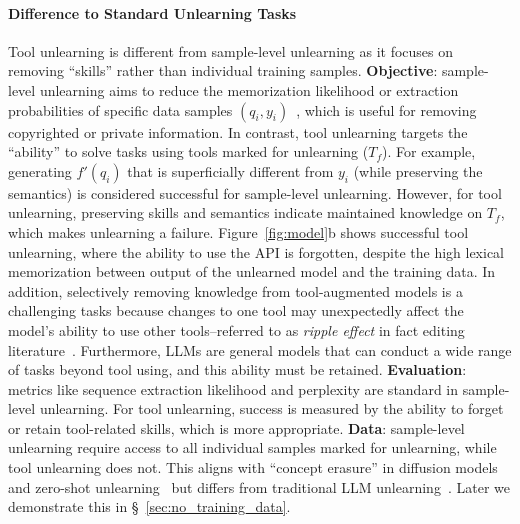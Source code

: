 \paragraph{Difference to Standard Unlearning Tasks} \label{sec:diff}
Tool unlearning is different from sample-level unlearning as it focuses on removing ``skills'' rather than individual training samples. 
%
\textbf{Objective}: sample-level unlearning aims to reduce the memorization likelihood or extraction probabilities of specific data samples $(q_i, y_i)$~\citep{jang-etal-2023-knowledge}, which is useful for removing copyrighted or private information. In contrast, tool unlearning targets the ``ability'' to solve tasks using tools marked for unlearning ($T_f$). For example, generating $f'(q_i)$ that is superficially different from $y_i$ (while preserving the semantics) is considered successful for sample-level unlearning. However, for tool unlearning, preserving skills and semantics indicate maintained knowledge on $T_f$, which makes unlearning a failure. Figure~\ref{fig:model}b shows successful tool unlearning, where the ability to use the API is forgotten, despite the high lexical memorization between output of the unlearned model and the training data.
In addition, selectively removing knowledge from tool-augmented models is a challenging tasks because changes to one tool may unexpectedly affect the model's ability to use other tools--referred to as {\em ripple effect} in fact editing literature~\citep{ripple_effect,gu2024model}. Furthermore, LLMs are general models that can conduct a wide range of tasks beyond tool using, and this ability must be retained. 
%
\textbf{Evaluation}: metrics like sequence extraction likelihood and perplexity are standard in sample-level unlearning. For tool unlearning, success is measured by the ability to forget or retain tool-related skills, which is more appropriate.
%
\textbf{Data}: sample-level unlearning require access to all individual samples marked for unlearning, while tool unlearning does not. This aligns with ``concept erasure'' in diffusion models~\citep{gandikota2023erasing,kumari2023conceptablation} and zero-shot unlearning~\citep{chundawat2022zero} but differs from traditional LLM unlearning~\citep{yao-etal-2024-machine}. Later we demonstrate this in \S~\ref{sec:no_training_data}.



